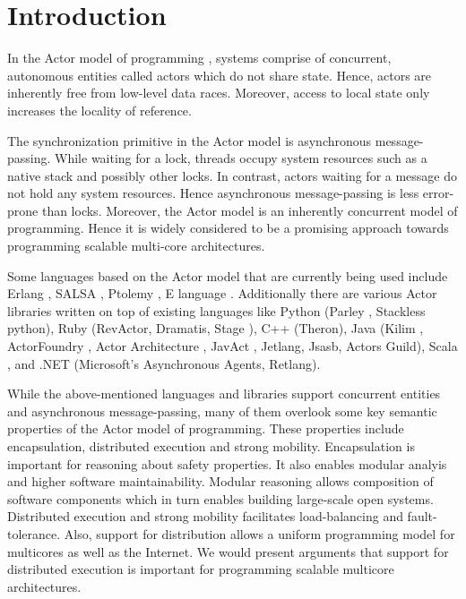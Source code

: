 \section{Introduction}
In the Actor model of programming \cite{ACTORS}, systems comprise of concurrent, autonomous entities called actors which do not share state.  Hence, actors are inherently free from low-level data races. Moreover, access to local state only increases the locality of reference.

The synchronization primitive in the Actor model is asynchronous message-passing.  While waiting for a lock, threads occupy system resources such as a native stack and possibly other locks. In contrast, actors waiting for a message
do not hold any system resources. Hence asynchronous message-passing is less error-prone than locks.
Moreover, the Actor model is an inherently concurrent model of programming.  Hence it is widely considered to be a promising approach towards programming scalable multi-core architectures.

Some languages based on the Actor model that are currently being used
include Erlang \cite{erlang-book}, SALSA
\cite{varela2001pdr}, Ptolemy \cite{ptolemy-actors}, E language \cite{elang}.
Additionally there are various Actor libraries written on top of existing languages like Python (Parley \cite{parley},
Stackless python), Ruby (RevActor, Dramatis, Stage \cite{stage}), C++ (Theron), Java (Kilim \cite{srinivasan2008kit},
ActorFoundry \cite{OAF}, Actor Architecture \cite{AA_Man}, JavAct \cite{Zwicky}, Jetlang, Jsasb, Actors Guild), Scala \cite{haller2007aut}, and .NET (Microsoft's Asynchronous Agents, Retlang).

While the above-mentioned languages and libraries support concurrent entities and asynchronous message-passing, many of them overlook some key semantic properties of the Actor model of programming. These properties include encapsulation, distributed execution and strong mobility. Encapsulation is important for reasoning about safety properties. It also enables modular analyis and higher software maintainability. Modular reasoning allows composition of software components which in turn enables building large-scale open systems. Distributed execution and strong mobility facilitates load-balancing and fault-tolerance. Also, support for distribution allows a uniform programming model for multicores as well as the Internet. We would present arguments that support for distributed execution is important for programming scalable multicore architectures.


